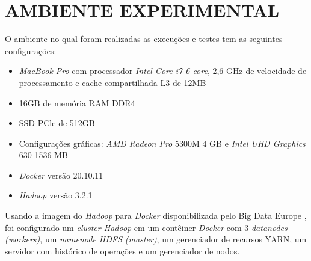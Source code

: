\section{AMBIENTE EXPERIMENTAL} \label{sec:ambienteexperimental}

O ambiente no qual foram realizadas as execuções e testes tem as seguintes configurações: 
\begin{itemize}
    \item \textit{MacBook Pro} com processador \textit{Intel Core i7 6-core}, 2,6 GHz de velocidade de processamento e cache compartilhada L3 de 12MB
    \item 16GB de memória RAM DDR4
    \item SSD PCle de 512GB
    \item Configurações gráficas: \textit{AMD Radeon Pro} 5300M 4 GB e \textit{Intel UHD Graphics} 630 1536 MB
    \item \textit{Docker} versão 20.10.11
    \item \textit{Hadoop} versão 3.2.1
\end{itemize}

Usando a imagem do \textit{Hadoop} para \textit{Docker} disponibilizada pelo Big Data Europe \cite{BigDataHadoopGithub}, foi configurado um \textit{cluster Hadoop} em um contêiner \textit{Docker} com 3 \textit{datanodes (workers)}, um \textit{namenode HDFS (master)}, um gerenciador de recursos YARN, um servidor com histórico de operações e um gerenciador de nodos.